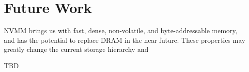 \section{Future Work} 
\label{sec:future}

NVMM brings us with fast, dense,
non-volatile, and byte-addressable memory, and has the
potential to replace DRAM in the near future. These properties may
greatly change the current storage hierarchy and 

TBD



